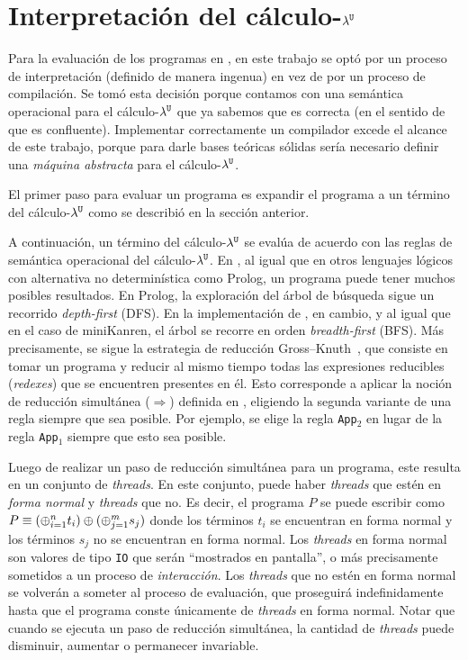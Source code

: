 \section{Interpretación del cálculo-$\lambda^{\mathtt{U}}$}
\label{sec:interpretacion_del_calculo_lambdaU}

Para la evaluación de los programas en \nuflo, en este trabajo se optó por un proceso de
interpretación (definido de manera ingenua) en vez de por un proceso de compilación.
Se tomó esta decisión porque contamos con una semántica operacional para el cálculo-$\lambda^{\mathtt{U}}$
que ya sabemos que es correcta (en el sentido de que es confluente).
Implementar correctamente un compilador excede el alcance de este
trabajo, porque para darle bases teóricas sólidas sería necesario definir una
{\em máquina abstracta} para el cálculo-$\lambda^{\mathtt{U}}$.

El primer paso para evaluar un programa \nuflo es expandir
el programa a un término del cálculo-$\lambda^{\mathtt{U}}$ como se describió en
la sección anterior.

A continuación, un término del cálculo-$\lambda^{\mathtt{U}}$ se evalúa de acuerdo con
las reglas de semántica operacional del cálculo-$\lambda^{\mathtt{U}}$.
En \nuflo, al igual que en otros lenguajes lógicos con alternativa no determinística
como Prolog, un programa puede tener muchos posibles resultados.
En Prolog, la exploración del árbol de búsqueda sigue un recorrido {\em depth-first} (DFS).
En la implementación de \nuflo, en cambio, y al igual que en el caso de miniKanren,
el árbol se recorre en orden {\em breadth-first} (BFS).
Más precisamente, se sigue la estrategia de reducción Gross--Knuth~\cite[Def.~4.9.5]{Terese},
que consiste en tomar un programa y reducir al mismo tiempo
todas las expresiones reducibles ({\em redexes}) que se encuentren presentes
en él.
Esto corresponde a aplicar la noción de reducción simultánea ($\Rightarrow$)
definida en , eligiendo la segunda variante de una regla
siempre que sea posible. Por ejemplo, se elige la regla \texttt{App$_2$}
en lugar de la regla \texttt{App$_1$} siempre que esto sea posible.

Luego de realizar un paso de reducción simultánea para un programa,
este resulta en un conjunto de {\em threads}. En este conjunto,
puede haber {\em threads} que estén en {\em forma normal} y {\em threads}
que no.
Es decir, el programa $P$ se puede escribir como
$P \equiv (\oplus_{i=1}^n t_i) \oplus (\oplus_{j=1}^m s_j)$
donde los términos $t_i$ se encuentran en forma normal
y los términos $s_j$ no se encuentran en forma normal.
Los {\em threads} en forma normal son valores de tipo \texttt{IO} que
serán ``mostrados en pantalla'', o más precisamente sometidos a un proceso
de {\em interacción}.
Los {\em threads} que no estén en forma normal
se volverán a someter al proceso de evaluación, que proseguirá indefinidamente
hasta que el programa conste únicamente de {\em threads} en forma normal.
Notar que cuando se ejecuta un paso de reducción simultánea,
la cantidad de {\em threads} puede disminuir, aumentar o permanecer invariable.
\medskip

